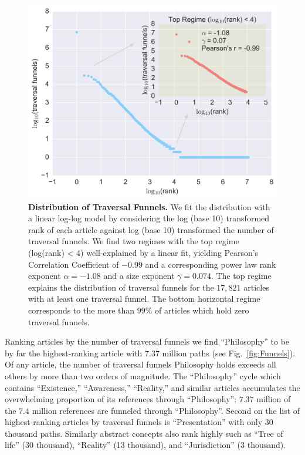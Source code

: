\documentclass[pre,twocolumn,twoside,superscriptaddress,floatfix, aps, 10pt]{revtex4-1}
\begin{document}
\begin{figure}[tp!]
  \includegraphics[width=\columnwidth]{graphics/funnels_distribution.png}
  \caption{
    \textbf{Distribution of Traversal Funnels.}
We fit the distribution with a linear log-log model by considering the log (base 10) transformed rank of each article against log (base 10) transformed the number of traversal funnels. 
We find two regimes with the top regime (log(rank) < 4) 
well-explained by a linear fit, yielding Pearson's 
Correlation Coefficient of $-0.99$ and a 
corresponding power law rank exponent $\alpha = -1.08$
and a size exponent $\gamma = 0.074$. The top regime 
explains the distribution of traversal funnels for the $17, 821$ 
articles with at least one traversal funnel. The bottom 
horizontal regime corresponds to the more than $99\%$ of articles
which hold zero traversal funnels.}
  \label{fig:Funnels Distribution}
\end{figure}
Ranking articles by the number of traversal funnels we find 
``Philosophy'' to be by far the highest-ranking article with 
$7.37$ million paths
(see Fig.~\ref{fig:Funnels}).
Of any article, the number of traversal funnels Philosophy holds exceeds 
all others by more than two orders of magnitude.
The ``Philosophy'' cycle which contains ``Existence,'' ``Awareness,'' ``Reality,'' 
and similar articles accumulates the overwhelming proportion of its 
references through ``Philosophy'': $7.37$ million of the $7.4$ million references
are funneled through ``Philosophy''.
Second on the list of highest-ranking articles by traversal funnels is 
``Presentation'' with only $30$ thousand paths. Similarly abstract 
concepts also rank highly such as ``Tree of life'' (30 thousand), 
``Reality'' (13 thousand), and ``Jurisdiction'' (3 thousand).
\end{document}
